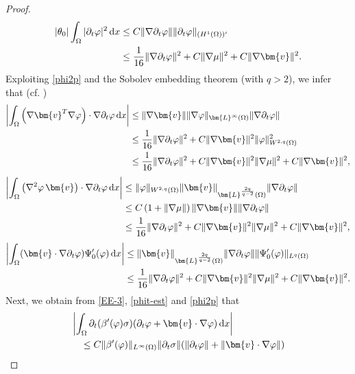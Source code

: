 \documentclass[11pt,reqno]{amsart}
\def\d{{\rm d}}
\def\vv{\bm{v}}
\begin{document}
\begin{proof}
\begin{align*}
|\theta_0| \int_{\Omega}  |\partial_t \varphi |^2 \, \d x
&\leq C \| \nabla \partial_t \varphi\| \| \partial_t \varphi\|_{(H^1(\Omega))'}\\
&\leq \frac{1}{16} \| \nabla \partial_t \varphi\|^2
+ C  \| \nabla \mu\|^2+ C\| \nabla \vv\|^2.
\end{align*}
Exploiting \eqref{phi2p} and the Sobolev embedding theorem (with $q>2$), we infer that (cf.  \cite{AGG2023})
%
\begin{align*}
\left| \int_{\Omega} \left( \nabla \vv^T \nabla \varphi \right) \cdot \nabla \partial_t \varphi \, \d x \right|
&\leq \| \nabla \vv\| \| \nabla \varphi\|_{\bm{L}^\infty(\Omega)} \| \nabla \partial_t \varphi\|\\
& \leq \frac{1}{16} \| \nabla \partial_t \varphi\|^2 +
C \| \nabla \vv\|^2 \| \varphi \|_{W^{2,q}(\Omega)}^2\\
& \leq \frac{1}{16} \| \nabla \partial_t \varphi\|^2 +
C \| \nabla \vv\|^2  \| \nabla \mu\|^2 +C \| \nabla \vv\|^2,
\end{align*}
%
\begin{align*}
\left|
\int_{\Omega} \left( \nabla^2 \varphi \, \vv \right) \cdot \nabla \partial_t \varphi \, \d x \right|
&\leq \| \varphi\|_{W^{2,q}(\Omega)} \| \vv\|_{\bm{L}^{\frac{2q}{q-2}}(\Omega)} \| \nabla \partial_t \varphi\| \\
& \leq  C\left( 1+  \| \nabla \mu \|  \right) \| \nabla \vv\|  \| \nabla \partial_t \varphi\| \\
&\leq \frac{1}{16} \| \nabla \partial_t \varphi\| ^2  +
C \| \nabla \vv\| ^2   \| \nabla \mu \| ^2+ C \| \nabla \vv\| ^2,
\end{align*}
%
\begin{align*}
\left| \int_{\Omega} (\vv \cdot \nabla \partial_t \varphi) \Psi_0'(\varphi) \, \d x \right|
&\leq \| \vv\|_{\bm{L}^\frac{2q}{q-2}(\Omega)} \| \nabla \partial_t \varphi\|  \|\Psi_0'(\varphi)\|_{L^q(\Omega)}
\\
& \le\frac{1}{16} \| \nabla \partial_t \varphi\|^2
+ C \| \nabla \vv\|^2  \| \nabla \mu \|^2+ C \| \nabla \vv\|^2.
\end{align*}
%
Next, we obtain from \eqref{EE-3}, \eqref{phit-est} and \eqref{phi2p} that
%
\begin{align}
&\left|  \int_\Omega \partial_t (\beta'(\varphi)\sigma)(\partial_t \varphi+ \vv \cdot \nabla \varphi)\,\mathrm{d}x\right|
\notag \\
&\quad \leq C\|\beta'(\varphi)\|_{L^\infty(\Omega)}\|\partial_t \sigma \|
 (\|\partial_t \varphi\| +\| \vv \cdot \nabla \varphi\|)

\end{align}
\end{proof}
\end{document}
